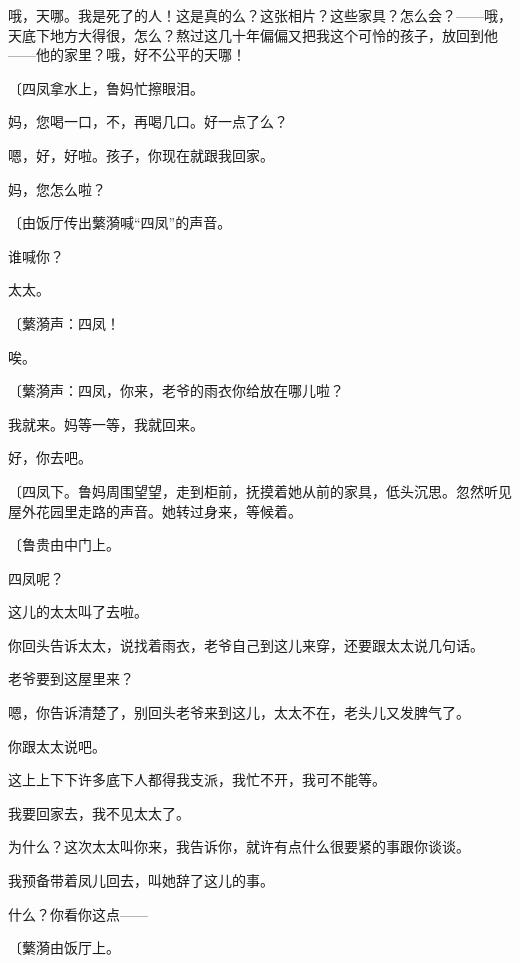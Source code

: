 哦，天哪。我是死了的人！这是真的么？这张相片？这些家具？怎么会？——哦，天底下地方大得很，怎么？熬过这几十年偏偏又把我这个可怜的孩子，放回到他——他的家里？哦，好不公平的天哪！

{\fangsong〔四凤拿水上，鲁妈忙擦眼泪。}

妈，您喝一口，不，再喝几口。好一点了么？

嗯，好，好啦。孩子，你现在就跟我回家。

妈，您怎么啦？

{\fangsong〔由饭厅传出蘩漪喊“四凤”的声音。}

谁喊你？

太太。

{\fangsong〔蘩漪声：四凤！}

唉。

{\fangsong〔蘩漪声：四凤，你来，老爷的雨衣你给放在哪儿啦？}

我就来。妈等一等，我就回来。

好，你去吧。

{\fangsong〔四凤下。鲁妈周围望望，走到柜前，抚摸着她从前的家具，低头沉思。忽然听见屋外花园里走路的声音。她转过身来，等候着。}

{\fangsong〔鲁贵由中门上。}

四凤呢？

这儿的太太叫了去啦。

你回头告诉太太，说找着雨衣，老爷自己到这儿来穿，还要跟太太说几句话。

老爷要到这屋里来？

嗯，你告诉清楚了，别回头老爷来到这儿，太太不在，老头儿又发脾气了。

你跟太太说吧。

这上上下下许多底下人都得我支派，我忙不开，我可不能等。

我要回家去，我不见太太了。

为什么？这次太太叫你来，我告诉你，就许有点什么很要紧的事跟你谈谈。

我预备带着凤儿回去，叫她辞了这儿的事。

什么？你看你这点——

{\fangsong〔蘩漪由饭厅上。}

